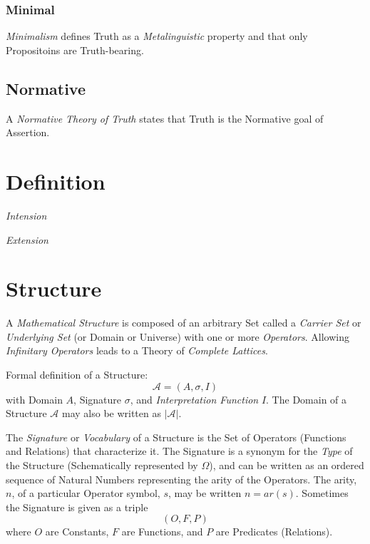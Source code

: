 \documentclass{article}
\begin{document}
\subsubsection{Minimal}

\emph{Minimalism} defines Truth as a \emph{Metalinguistic} property
and that only Propositoins are Truth-bearing.

\subsection{Normative}

A \emph{Normative Theory of Truth} states that Truth is the Normative
goal of Assertion.



\section{Definition}\label{sec:semantic_definition}

\emph{Intension}

\emph{Extension}



\section{Structure}\label{sec:mathematical_structure}

A \emph{Mathematical Structure} is composed of an arbitrary Set called
a \emph{Carrier Set} or \emph{Underlying Set} (or Domain or Universe)
with one or more \emph{Operators}. Allowing \emph{Infinitary
  Operators} leads to a Theory of \emph{Complete Lattices}.

Formal definition of a Structure:
\[
    \mathcal{A} = (A, \sigma, I)
\]
with Domain $A$, Signature $\sigma$, and \emph{Interpretation
  Function} $I$. The Domain of a Structure $\mathcal{A}$ may also be
written as $|\mathcal{A}|$.

The \emph{Signature} or \emph{Vocabulary} of a Structure is the Set of
Operators (Functions and Relations) that characterize it. The
Signature is a synonym for the \emph{Type} of the Structure
(Schematically represented by $\Omega$), and can be written as an
ordered sequence of Natural Numbers representing the arity of the
Operators. The arity, $n$, of a particular Operator symbol, $s$, may
be written $n=ar(s)$. Sometimes the Signature is given as a triple
\[
    (O,F,P)
\]
where $O$ are Constants, $F$ are Functions, and $P$ are Predicates
(Relations).
\end{document}
